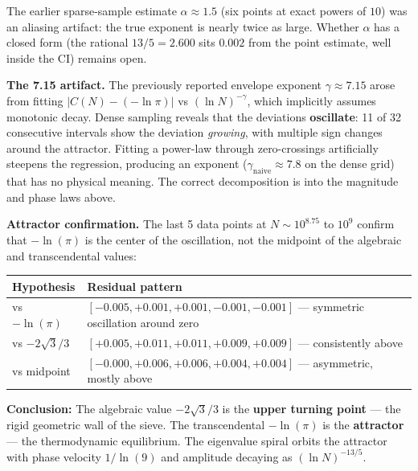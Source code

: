 \documentclass[
  11pt,
]{article}
\newcounter{none} %
\numberwithin{equation}{section}
\begin{document}
The earlier sparse-sample estimate \(\alpha \approx 1.5\) (six points at
exact powers of \(10\)) was an aliasing artifact: the true exponent is
nearly twice as large. Whether \(\alpha\) has a closed form (the
rational \(13/5 = 2.600\) sits \(0.002\) from the point estimate, well
inside the CI) remains open.

\textbf{The 7.15 artifact.} The previously reported envelope exponent
\(\gamma \approx 7.15\) arose from fitting \(|C(N) - (-\ln\pi)|\) vs
\((\ln N)^{-\gamma}\), which implicitly assumes monotonic decay. Dense
sampling reveals that the deviations \textbf{oscillate}: 11 of 32
consecutive intervals show the deviation \emph{growing}, with multiple
sign changes around the attractor. Fitting a power-law through
zero-crossings artificially steepens the regression, producing an
exponent (\(\gamma_{\text{naive}} \approx 7.8\) on the dense grid) that
has no physical meaning. The correct decomposition is into the magnitude
and phase laws above.

\textbf{Attractor confirmation.} The last 5 data points at
\(N \sim 10^{8.75}\) to \(10^9\) confirm that \(-\ln(\pi)\) is the
center of the oscillation, not the midpoint of the algebraic and
transcendental values:

{\def\LTcaptype{none} %
\begin{longtable}[]{@{}
  >{\raggedright\arraybackslash}p{}
  >{\raggedright\arraybackslash}p{}@{}}
\toprule\noalign{}
Hypothesis & Residual pattern \\
\midrule\noalign{}
\endhead
\bottomrule\noalign{}
\endlastfoot
vs \(-\ln(\pi)\) & \([-0.005, +0.001, +0.001, -0.001, -0.001]\) ---
symmetric oscillation around zero \\
vs \(-2\sqrt{3}/3\) & \([+0.005, +0.011, +0.011, +0.009, +0.009]\) ---
consistently above \\
vs midpoint & \([-0.000, +0.006, +0.006, +0.004, +0.004]\) ---
asymmetric, mostly above \\
\end{longtable}
}

\textbf{Conclusion:} The algebraic value \(-2\sqrt{3}/3\) is the
\textbf{upper turning point} --- the rigid geometric wall of the sieve.
The transcendental \(-\ln(\pi)\) is the \textbf{attractor} --- the
thermodynamic equilibrium. The eigenvalue spiral orbits the attractor
with phase velocity \(1/\ln(9)\) and amplitude decaying as
\((\ln N)^{-13/5}\).
\end{document}
